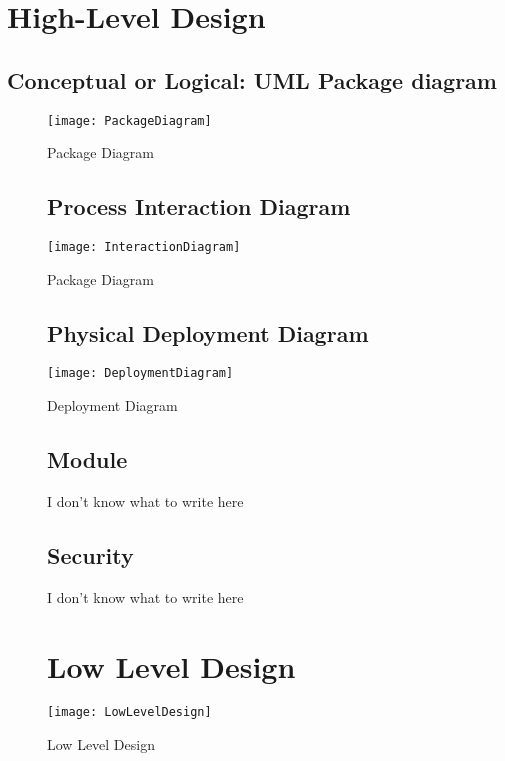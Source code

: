 \section{High-Level Design}
\subsection{Conceptual or Logical: UML Package diagram} 

\begin{figure}[ht]
\center
\texttt{[image: PackageDiagram]}
\caption{Package Diagram}
\label{fig:Package Diagram}
\end{figure}
\clearpage
\begin{figure}
\subsection{Process Interaction Diagram}
\center
\texttt{[image: InteractionDiagram]}
\caption{Package Diagram}
\label{fig:Package Diagram}
\end{figure}

\begin{figure}
\subsection{Physical Deployment Diagram}
\center
\texttt{[image: DeploymentDiagram]}
\caption{Deployment Diagram}
\label{fig:DeploymentDiagram}
\end{figure}

\begin{figure}

\subsection{Module} 
I don’t know what to write here
\end{figure}
\begin{figure}

\subsection{Security} 		

 I don’t know what to write here
\end{figure}

\begin{figure}

\section{Low Level Design} 
\center
\texttt{[image: LowLevelDesign]}
\caption{Low Level Design}
\label{fig:Low Level Design}
\end{figure}

